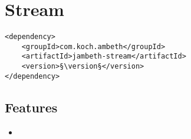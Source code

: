 \section{Stream}
\label{module:Stream}
\ClearAPI
\TODO
\begin{lstlisting}[style=POM,caption={Maven modules to use \emph{Ambeth Stream}}]
<dependency>
	<groupId>com.koch.ambeth</groupId>
	<artifactId>jambeth-stream</artifactId>
	<version>§\version§</version>
</dependency>
\end{lstlisting}
\subsection{Features}
\begin{itemize}
	\item \TODO
\end{itemize}


